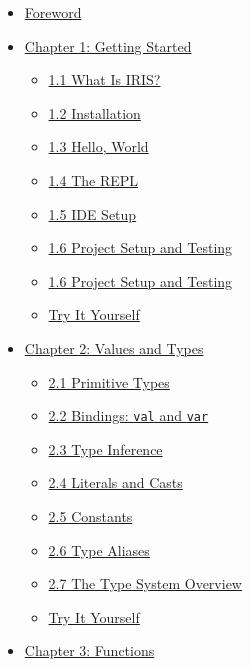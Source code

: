 \documentclass[
  english,
]{book}
\providecommand{\tightlist}{%
  \setlength{\itemsep}{0pt}\setlength{\parskip}{0pt}}
\begin{document}
\begin{itemize}
\tightlist
\item
  \hyperref[foreword]{Foreword}
\item
  \hyperref[chapter-1-getting-started]{Chapter 1: Getting Started}

  \begin{itemize}
  \tightlist
  \item
    \hyperref[11-what-is-iris]{1.1 What Is IRIS?}
  \item
    \hyperref[12-installation]{1.2 Installation}
  \item
    \hyperref[13-hello-world]{1.3 Hello, World}
  \item
    \hyperref[14-the-repl]{1.4 The REPL}
  \item
    \hyperref[15-ide-setup]{1.5 IDE Setup}
  \item
    \hyperref[16-project-setup-and-testing]{1.6 Project Setup and
    Testing}
  \item
    \hyperref[16-project-setup-and-testing]{1.6 Project Setup and
    Testing}
  \item
    \hyperref[try-it-yourself]{Try It Yourself}
  \end{itemize}
\item
  \hyperref[chapter-2-values-and-types]{Chapter 2: Values and Types}

  \begin{itemize}
  \tightlist
  \item
    \hyperref[21-primitive-types]{2.1 Primitive Types}
  \item
    \hyperref[22-bindings-val-and-var]{2.2 Bindings: \texttt{val} and
    \texttt{var}}
  \item
    \hyperref[23-type-inference]{2.3 Type Inference}
  \item
    \hyperref[24-literals-and-casts]{2.4 Literals and Casts}
  \item
    \hyperref[25-constants]{2.5 Constants}
  \item
    \hyperref[26-type-aliases]{2.6 Type Aliases}
  \item
    \hyperref[27-the-type-system-overview]{2.7 The Type System Overview}
  \item
    \hyperref[try-it-yourself]{Try It Yourself}
  \end{itemize}
\item
  \hyperref[chapter-3-functions]{Chapter 3: Functions}


\end{itemize}
\end{document}
